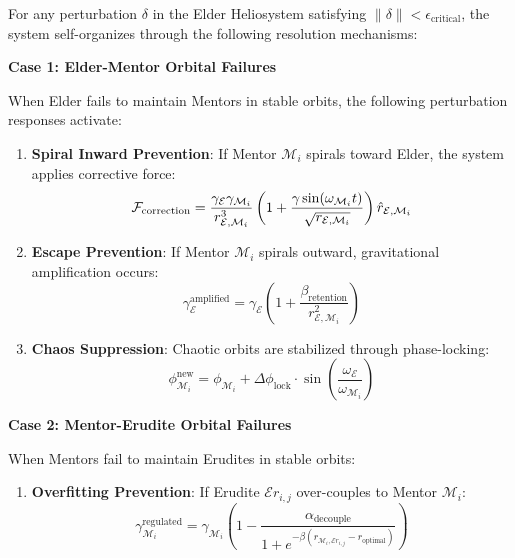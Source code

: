 \begin{theorem}
\label{thm:perturbation_stabilization}
For any perturbation $\delta$ in the Elder Heliosystem satisfying $\|\delta\| < \epsilon_{\text{critical}}$, the system self-organizes through the following resolution mechanisms:

\textbf{Case 1: Elder-Mentor Orbital Failures}

When Elder fails to maintain Mentors in stable orbits, the following perturbation responses activate:

\begin{enumerate}
    \item \textbf{Spiral Inward Prevention}: If Mentor $\mathcal{M}_i$ spirals toward Elder, the system applies corrective force:
    \begin{equation}
    \mathcal{F}_{\text{correction}} = \frac{\gamma_{\mathcal{E}} \gamma_{\mathcal{M}_i}}{r_{\mathcal{E},\mathcal{M}_i}^3} \left(1 + \frac{\gamma \sin(\omega_{\mathcal{M}_i} t)}{\sqrt{r_{\mathcal{E},\mathcal{M}_i}}}\right) \hat{r}_{\mathcal{E},\mathcal{M}_i}
    \end{equation}
    
    \item \textbf{Escape Prevention}: If Mentor $\mathcal{M}_i$ spirals outward, gravitational amplification occurs:
    \begin{equation}
    \gamma_{\mathcal{E}}^{\text{amplified}} = \gamma_{\mathcal{E}} \left(1 + \frac{\beta_{\text{retention}}}{r_{\mathcal{E},\mathcal{M}_i}^2}\right)
    \end{equation}
    
    \item \textbf{Chaos Suppression}: Chaotic orbits are stabilized through phase-locking:
    \begin{equation}
    \phi_{\mathcal{M}_i}^{\text{new}} = \phi_{\mathcal{M}_i} + \Delta\phi_{\text{lock}} \cdot \sin\left(\frac{\omega_{\mathcal{E}}}{\omega_{\mathcal{M}_i}}\right)
    \end{equation}
\end{enumerate}

\textbf{Case 2: Mentor-Erudite Orbital Failures}

When Mentors fail to maintain Erudites in stable orbits:

\begin{enumerate}
    \item \textbf{Overfitting Prevention}: If Erudite $\mathcal{E}r_{i,j}$ over-couples to Mentor $\mathcal{M}_i$:
    \begin{equation}
    \gamma_{\mathcal{M}_i}^{\text{regulated}} = \gamma_{\mathcal{M}_i} \left(1 - \frac{\alpha_{\text{decouple}}}{1 + e^{-\beta(r_{\mathcal{M}_i,\mathcal{E}r_{i,j}} - r_{\text{optimal}})}}\right)
    \end{equation}
    

\end{enumerate}
\end{theorem}
